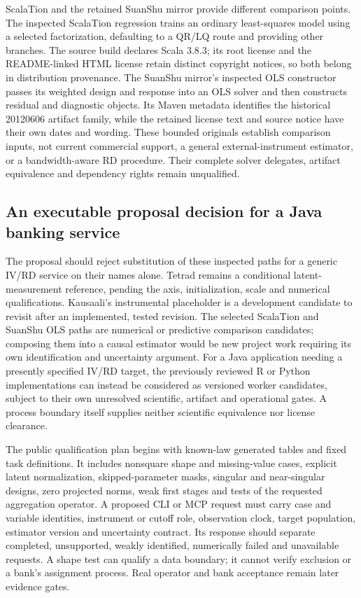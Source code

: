 ScalaTion and the retained SuanShu mirror provide different comparison points. The inspected ScalaTion regression trains an ordinary least-squares model using a selected factorization, defaulting to a QR/LQ route and providing other branches. The source build declares Scala 3.8.3; its root license and the README-linked HTML license retain distinct copyright notices, so both belong in distribution provenance. The SuanShu mirror's inspected OLS constructor passes its weighted design and response into an OLS solver and then constructs residual and diagnostic objects. Its Maven metadata identifies the historical 20120606 artifact family, while the retained license text and source notice have their own dates and wording. These bounded originals establish comparison inputs, not current commercial support, a general external-instrument estimator, or a bandwidth-aware RD procedure. Their complete solver delegates, artifact equivalence and dependency rights remain unqualified.~\citep{exec25_javaiv_scalation,exec25_javaiv_suan}

\subsection{An executable proposal decision for a Java banking service}

The proposal should reject substitution of these inspected paths for a generic IV/RD service on their names alone. Tetrad remains a conditional latent-measurement reference, pending the axis, initialization, scale and numerical qualifications. Kausaali's instrumental placeholder is a development candidate to revisit after an implemented, tested revision. The selected ScalaTion and SuanShu OLS paths are numerical or predictive comparison candidates; composing them into a causal estimator would be new project work requiring its own identification and uncertainty argument. For a Java application needing a presently specified IV/RD target, the previously reviewed R or Python implementations can instead be considered as versioned worker candidates, subject to their own unresolved scientific, artifact and operational gates. A process boundary itself supplies neither scientific equivalence nor license clearance.~\citep{exec25_javaiv_choice,exec25_pyrdiv_choice}

The public qualification plan begins with known-law generated tables and fixed task definitions. It includes nonsquare shape and missing-value cases, explicit latent normalization, skipped-parameter masks, singular and near-singular designs, zero projected norms, weak first stages and tests of the requested aggregation operator. A proposed CLI or MCP request must carry case and variable identities, instrument or cutoff role, observation clock, target population, estimator version and uncertainty contract. Its response should separate completed, unsupported, weakly identified, numerically failed and unavailable requests. A shape test can qualify a data boundary; it cannot verify exclusion or a bank's assignment process. Real operator and bank acceptance remain later evidence gates.

